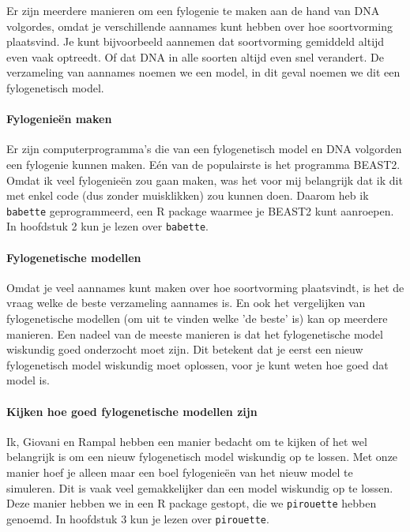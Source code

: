 {Er zijn meerdere manieren om een fylogenie te maken 
aan de hand van DNA volgordes, omdat je verschillende
aannames kunt hebben over hoe soortvorming plaatsvind.
Je kunt bijvoorbeeld aannemen dat soortvorming gemiddeld altijd
even vaak optreedt. Of dat DNA in alle soorten altijd even snel
verandert. De verzameling van aannames noemen we een model,
in dit geval noemen we dit een fylogenetisch model.

\paragraph{Fylogenieën maken}

Er zijn computerprogramma's die van een fylogenetisch model en DNA
volgorden een fylogenie kunnen maken. Eén van de populairste is
het programma BEAST2. Omdat ik veel fylogenieën zou gaan maken, 
was het voor mij belangrijk dat ik dit met enkel code (dus zonder 
muisklikken) zou kunnen doen. Daarom heb ik \verb;babette;
geprogrammeerd, een R package waarmee je BEAST2 kunt aanroepen.
In hoofdstuk 2 kun je lezen over \verb;babette;.

\paragraph{Fylogenetische modellen}

Omdat je veel aannames kunt maken over hoe soortvorming plaatsvindt,
is het de vraag welke de beste verzameling aannames is.
En ook het vergelijken van fylogenetische modellen (om uit te vinden
welke 'de beste' is) kan op meerdere manieren. 
Een nadeel van de meeste manieren is dat het fylogenetische model
wiskundig goed onderzocht moet zijn. 
Dit betekent dat je eerst een nieuw fylogenetisch model wiskundig moet oplossen,
voor je kunt weten hoe goed dat model is.

\paragraph{Kijken hoe goed fylogenetische modellen zijn}

Ik, Giovani en Rampal hebben een manier bedacht om
te kijken of het wel belangrijk is om een nieuw fylogenetisch
model wiskundig op te lossen.
Met onze manier hoef je alleen maar een boel fylogenieën
van het nieuw model te simuleren.
Dit is vaak veel gemakkelijker dan een model wiskundig op te lossen.
Deze manier hebben we in een R package gestopt, die we
\verb;pirouette; hebben genoemd. In hoofdstuk 3 kun je lezen
over \verb;pirouette;.

}
